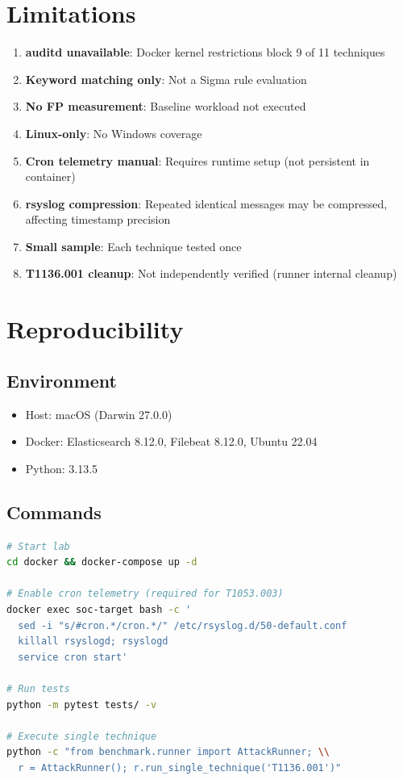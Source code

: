 \documentclass[11pt,a4paper]{article}
\begin{document}
\section{Limitations}

\begin{enumerate}
    \item \textbf{auditd unavailable}: Docker kernel restrictions block 9 of 11 techniques
    \item \textbf{Keyword matching only}: Not a Sigma rule evaluation
    \item \textbf{No FP measurement}: Baseline workload not executed
    \item \textbf{Linux-only}: No Windows coverage
    \item \textbf{Cron telemetry manual}: Requires runtime setup (not persistent in container)
    \item \textbf{rsyslog compression}: Repeated identical messages may be compressed, affecting timestamp precision
    \item \textbf{Small sample}: Each technique tested once
    \item \textbf{T1136.001 cleanup}: Not independently verified (runner internal cleanup)
\end{enumerate}

\section{Reproducibility}

\subsection{Environment}

\begin{itemize}
    \item Host: macOS (Darwin 27.0.0)
    \item Docker: Elasticsearch 8.12.0, Filebeat 8.12.0, Ubuntu 22.04
    \item Python: 3.13.5
\end{itemize}

\subsection{Commands}

\begin{lstlisting}[language=bash]
# Start lab
cd docker && docker-compose up -d

# Enable cron telemetry (required for T1053.003)
docker exec soc-target bash -c '
  sed -i "s/#cron.*/cron.*/" /etc/rsyslog.d/50-default.conf
  killall rsyslogd; rsyslogd
  service cron start'

# Run tests
python -m pytest tests/ -v

# Execute single technique
python -c "from benchmark.runner import AttackRunner; \\
  r = AttackRunner(); r.run_single_technique('T1136.001')"
\end{lstlisting}
\end{document}
